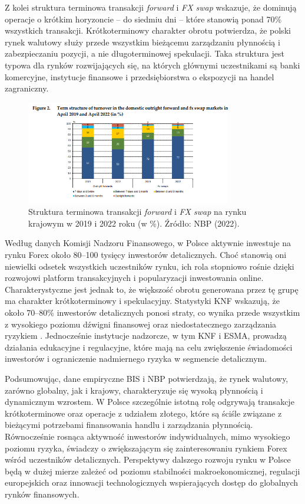 Z kolei struktura terminowa transakcji \textit{forward} i \textit{FX swap} wskazuje, że dominują operacje o krótkim horyzoncie – do siedmiu dni – które stanowią ponad 70\% wszystkich transakcji. 
Krótkoterminowy charakter obrotu potwierdza, że polski rynek walutowy służy przede wszystkim bieżącemu zarządzaniu płynnością i zabezpieczaniu pozycji, a nie długoterminowej spekulacji. 
Taka struktura jest typowa dla rynków rozwijających się, na których głównymi uczestnikami są banki komercyjne, instytucje finansowe i przedsiębiorstwa o ekspozycji na handel zagraniczny.

\begin{figure}[h!]
  \centering
  \includegraphics[width=0.8\textwidth]{plots/nbp_fx_poland_2022_swap.png}
  \caption{Struktura terminowa transakcji \textit{forward} i \textit{FX swap} na rynku krajowym w 2019 i 2022 roku (w \%). Źródło: NBP (2022).}
  \label{fig:nbp_swap_structure}
\end{figure}

Według danych Komisji Nadzoru Finansowego, w Polsce aktywnie inwestuje na rynku Forex około 80–100 tysięcy inwestorów detalicznych. 
Choć stanowią oni niewielki odsetek wszystkich uczestników rynku, ich rola stopniowo rośnie dzięki rozwojowi platform transakcyjnych i popularyzacji inwestowania online. 
Charakterystyczne jest jednak to, że większość obrotu generowana przez tę grupę ma charakter krótkoterminowy i spekulacyjny. 
Statystyki KNF wskazują, że około 70–80\% inwestorów detalicznych ponosi straty, co wynika przede wszystkim z wysokiego poziomu dźwigni finansowej oraz niedostatecznego zarządzania ryzykiem \parencite{knf2023}. 
Jednocześnie instytucje nadzorcze, w tym KNF i ESMA, prowadzą działania edukacyjne i regulacyjne, które mają na celu zwiększenie świadomości inwestorów i ograniczenie nadmiernego ryzyka w segmencie detalicznym.

Podsumowując, dane empiryczne BIS i NBP potwierdzają, że rynek walutowy, zarówno globalny, jak i krajowy, charakteryzuje się wysoką płynnością i dynamicznym wzrostem. 
W Polsce szczególnie istotną rolę odgrywają transakcje krótkoterminowe oraz operacje z udziałem złotego, które są ściśle związane z bieżącymi potrzebami finansowania handlu i zarządzania płynnością. 
Równocześnie rosnąca aktywność inwestorów indywidualnych, mimo wysokiego poziomu ryzyka, świadczy o zwiększającym się zainteresowaniu rynkiem Forex wśród uczestników detalicznych. 
Perspektywy dalszego rozwoju rynku w Polsce będą w dużej mierze zależeć od poziomu stabilności makroekonomicznej, 
regulacji europejskich oraz innowacji technologicznych wspierających dostęp do globalnych rynków finansowych.